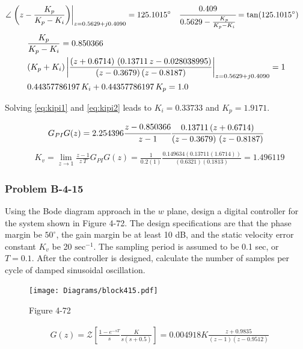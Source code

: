 \begin{align*}
& \angle \left.\left(z-\frac{K_p}{K_p-K_i}\right)\right\vert_{z=0.5629 +j0.4090} = 125.1015^\circ \quad \cfrac{0.409}{0.5629-\frac{K_p}{K_p-K_i}} = \tan(125.1015^\circ)
\end{align*}
\begin{align}
&
\frac{K_p}{K_p-K_i}= 0.850366 \label{eq:kipi1} \\
\notag & (K_p+K_i)\left|\frac{\left(z+0.6714\right)\,\left(0.13711\,z-0.028038995\right)}{(z-0.3679)\,(z-0.8187)}\right|_{z=0.5629 +j0.4090}=1 \\ 
&
0.44357786197\,K_i+0.44357786197\,K_p=1.0 \label{eq:kipi2} 
\end{align}

Solving \eqref{eq:kipi1} and \eqref{eq:kipi2} leads to $K_i=0.33733$ and $K_p=1.9171$.

\[
G_{PI}G(z)=2.254396\cfrac{z-0.850366}{z-1}\frac{0.13711\,(z+0.6714)}{\left(z-0.3679\right)\,\left(z-0.8187\right)}
\]
\begin{align*}
& K_v = \lim\limits_{z \rightarrow 1} \frac{z-1}{z \ T} G_{PI}G(z) = \frac{1}{0.2(1)} \frac{0.149634(0.13711(1.6714))}{(0.6321)(0.1813)}=1.496119
\end{align*}
\subsubsection*{Problem B-4-15}
Using the Bode diagram approach in the $w$ plane, design a digital controller for the system shown in Figure 4-72. The design specifications are that the phase margin be $50^\circ$, the gain margin be at least 10 dB, and the static velocity error constant $K_v$ be 20 $\text{sec}^{-1}$. The sampling period is assumed to be 0.1 sec, or $T = 0.1$. After the controller is designed, calculate the number of samples per cycle of damped sinusoidal oscillation.

\begin{figure}[H]
	\centering
	\texttt{[image: Diagrams/block415.pdf]}
	\caption*{Figure 4-72}
	\label{fig:samplerblock415}
\end{figure}

\begin{align*}
& G(z) = \mathcal{Z} \left[\frac{1-e^{-sT}}{s}\frac{K}{s(s+0.5)}\right]=0.004918K \frac{z+0.9835}{(z-1)(z-0.9512)}
\end{align*}

